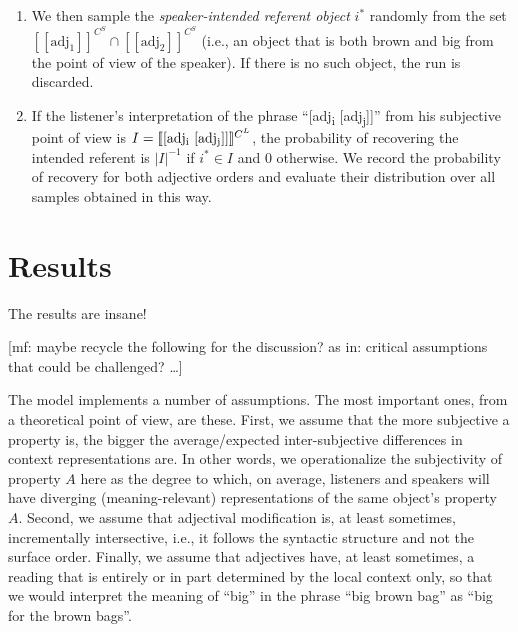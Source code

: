 \documentclass[10pt,a4paper]{article}
\newcommand{\den}[1]{\ensuremath{[\![#1]\!]}}
\newcommand{\gcs}[1]{\textcolor{blue}{[gcs: #1]}}
\newcommand{\mf}[1]{\textcolor{BrickRed}{[mf: #1]}}
\begin{document}
\begin{enumerate}
  \begin{align*}
   \den{\text{[adj\textsubscript{i} [adj\textsubscript{j}]]}}^{C^X} & = \den{\text{adj}_i}^{\den{\text{adj}_j}^{C^X}} 
  \end{align*}
  \mf{Should some of this go into the previous section on semantics? --- I tend to say yes.} \gcs{hmm.. probably. I've left a placeholder above.}
\item We then sample the \emph{speaker-intended referent object} $i^*$ randomly from the set $\den{\text{adj}_1}^{C^S} \cap \den{\text{adj}_2}^{C^S}$ (i.e., an object that is both brown and big from the point of view of the speaker). If there is no such object, the run is discarded.
\item If the listener's interpretation of the phrase ``[adj\textsubscript{i} [adj\textsubscript{j}]]'' from his subjective point of view is $I = \den{\text{[adj\textsubscript{i} [adj\textsubscript{j}]]}}^{C^L}$, the probability of recovering the intended referent is $|I|^{-1}$ if $i^* \in I$ and 0 otherwise. We record the probability of recovery for both adjective orders and evaluate their distribution over all samples obtained in this way.
\end{enumerate}

\section{Results}

The results are insane!

\bigskip
\bigskip
\bigskip

\mf{maybe recycle the following for the discussion? as in: critical assumptions that could be challenged? \dots}

The model implements a number of assumptions. The most important ones, from a theoretical point of view, are these. First, we assume that the more subjective a property is, the bigger the average/expected inter-subjective differences in context representations are. In other words, we operationalize the subjectivity of property $A$ here as the degree to which, on average, listeners and speakers will have diverging (meaning-relevant) representations of the same object's property $A$. Second, we assume that adjectival modification is, at least sometimes, incrementally intersective, i.e., it follows the syntactic structure and not the surface order. Finally, we assume that adjectives have, at least sometimes, a reading that is entirely or in part determined by the local context only, so that we would interpret the meaning of ``big''  in the phrase ``big brown bag'' as ``big for the brown bags''.

\bigskip






\setlength{\bibleftmargin}{.125in}
\setlength{\bibindent}{-\bibleftmargin}


\end{document}
